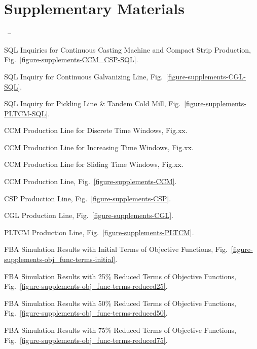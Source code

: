 \chapter*{Supplementary Materials}\label{Supp_first}
%
{\thepage\ -- \pageref{LastPage}}

\captionsetup{list=no}
\begin{itemize}
	\item SQL Inquiries for Continuous Casting Machine and Compact Strip Production, Fig.~\ref{figure-supplements-CCM_CSP-SQL}.
	\item SQL Inquiry for Continuous Galvanizing Line, Fig.~\ref{figure-supplements-CGL-SQL}.
	\item SQL Inquiry for Pickling Line \& Tandem Cold Mill, Fig.~\ref{figure-supplements-PLTCM-SQL}.
	
{\color{red}
	\item CCM Production Line for Discrete Time Windows, Fig.xx.
	\item CCM Production Line for Increasing Time Windows, Fig.xx.
	\item CCM Production Line for Sliding Time Windows, Fig.xx.}
	\item CCM Production Line, Fig.~\ref{figure-supplements-CCM}.
	\item CSP Production Line, Fig.~\ref{figure-supplements-CSP}.
	\item CGL Production Line, Fig.~\ref{figure-supplements-CGL}.
	\item PLTCM Production Line, Fig.~\ref{figure-supplements-PLTCM}.
	
	\item FBA Simulation Results with Initial Terms of Objective Functions, Fig.~\ref{figure-supplements-obj_func-terms-initial}.
	\item FBA Simulation Results with 25\% Reduced Terms of Objective Functions, Fig.~\ref{figure-supplements-obj_func-terms-reduced25}.
	\item FBA Simulation Results with 50\% Reduced Terms of Objective Functions, Fig.~\ref{figure-supplements-obj_func-terms-reduced50}.
	\item FBA Simulation Results with 75\% Reduced Terms of Objective Functions, Fig.~\ref{figure-supplements-obj_func-terms-reduced75}.
\end{itemize}
\clearpage

\beginsupplement












